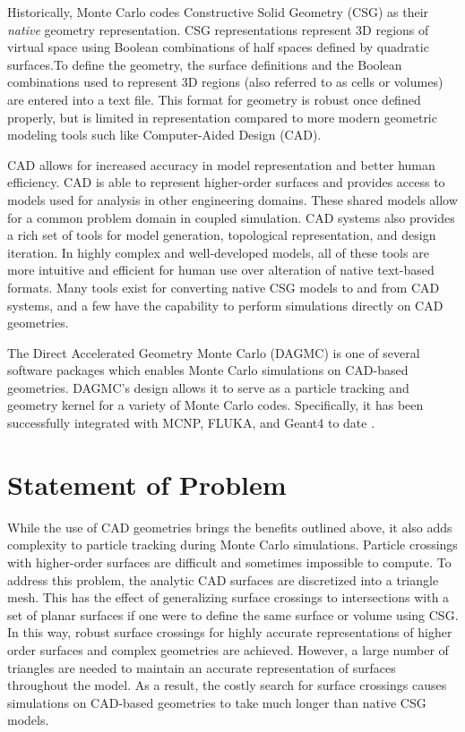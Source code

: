 Historically, Monte Carlo codes Constructive Solid Geometry (CSG) as their
\textit{native} geometry representation. CSG representations represent 3D
regions of virtual space using Boolean combinations of half spaces defined by
quadratic surfaces.To define the geometry, the surface definitions and the
Boolean combinations used to represent 3D regions (also referred to as cells or
volumes) are entered into a text file. This format for geometry is robust once
defined properly, but is limited in representation compared to more modern
geometric modeling tools such like Computer-Aided Design (CAD).

CAD allows for increased accuracy in model representation and better human
efficiency. CAD is able to represent higher-order surfaces and provides access
to models used for analysis in other engineering domains. These shared models
allow for a common problem domain in coupled simulation. CAD systems also provides a
rich set of tools for model generation, topological representation, and design
iteration. In highly complex and well-developed models, all of these tools are
more intuitive and efficient for human use over alteration of native text-based
formats. Many tools exist for converting native CSG models to and from CAD
systems, and a few have the capability to perform simulations directly on CAD
geometries.

The Direct Accelerated Geometry Monte Carlo (DAGMC) \cite{Tautges_2009} is one
of several software packages which enables Monte Carlo simulations on CAD-based
geometries. DAGMC's design allows it to serve as a particle
tracking and geometry kernel for a variety of Monte Carlo codes. Specifically,
it has been successfully integrated with MCNP, FLUKA, and Geant4 to
date \cite{LANL_MCNP5_VOLIII, Bohlen_2014, GEANT4_2003}.

\section{Statement of Problem}

While the use of CAD geometries brings the benefits outlined above, it also adds
complexity to particle tracking during Monte Carlo simulations. Particle
crossings with higher-order surfaces are difficult and sometimes impossible to
compute. To address this problem, the analytic CAD surfaces are
discretized into a triangle mesh. This has the effect of generalizing surface crossings to
intersections with a set of planar surfaces if one were to define the same
surface or volume using CSG. In this way, robust surface crossings for highly
accurate representations of higher order surfaces and complex geometries are
achieved. However, a large number of triangles are needed to maintain an
accurate representation of surfaces throughout the model. As a result, the
costly search for surface crossings causes simulations on CAD-based geometries
to take much longer than native CSG models.

